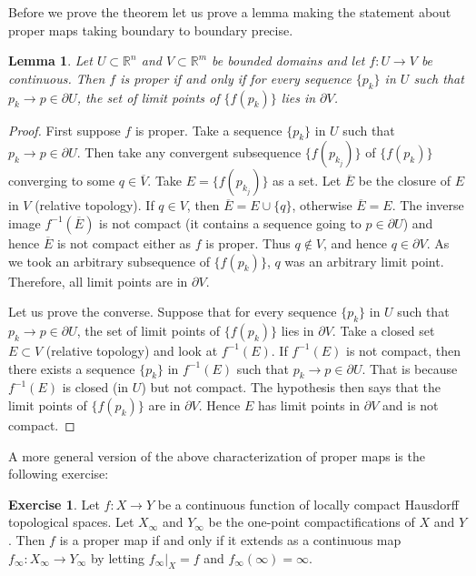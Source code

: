 \documentclass[12pt,openany]{book}
\newcommand{\R}{{\mathbb{R}}}
\theoremstyle{plain}
\newtheorem{lemma}[thm]{Lemma}
\theoremstyle{remark}
\theoremstyle{definition}
\newenvironment{exbox}{%
    \def\FrameCommand{\vrule width 1pt \relax\hspace {10pt}}%
    \MakeFramed {\advance \hsize -\width \FrameRestore }%
}{%
    \endMakeFramed
}
\theoremstyle{exercise}
\newtheorem{exercise}{Exercise}[section]
\theoremstyle{example}
\begin{document}
Before we prove the theorem let us prove a lemma making the statement about
proper maps taking boundary to boundary precise.

\begin{lemma} \label{lemma:bndrytobndry}
Let $U \subset \R^n$ and $V \subset \R^m$ be bounded domains and
let $f \colon U \to V$ be continuous.
Then $f$ is proper if and only if
for every sequence $\{ p_k \}$ in $U$ such that $p_k \to p \in \partial U$,
the set of limit points of $\{ f(p_k) \}$ lies in $\partial V$.
\end{lemma}

\begin{proof}
First suppose $f$ is proper.  Take a 
sequence $\{ p_k \}$ in $U$ such that $p_k \to p \in \partial U$.
Then take any convergent subsequence $\{ f(p_{k_j}) \}$ of $\{ f(p_k) \}$
converging to some $q \in \overline{V}$.  Take
$E = \{ f(p_{k_j}) \}$ as a set.  Let $\overline{E}$ be the closure of $E$
in $V$ (relative topology).  If $q \in V$, then $\overline{E} = E \cup \{ q \}$, otherwise
$\overline{E} = E$.
The inverse image $f^{-1}(\overline{E})$
is not compact (it contains a sequence going to $p \in \partial U$)
and hence $\overline{E}$ is not
compact either as $f$ is proper.  Thus $q \notin V$, and hence $q \in
\partial V$.  As we took an arbitrary subsequence of $\{ f(p_k) \}$, $q$ was
an arbitrary limit point.  Therefore, all limit points are in $\partial V$.

Let us prove the converse.
Suppose that for every sequence
$\{ p_k \}$ in $U$ such that $p_k \to p \in \partial U$,
the set of limit points of $\{ f(p_k) \}$ lies in $\partial V$.
Take a closed set $E \subset V$ (relative topology) and look at $f^{-1}(E)$.  If $f^{-1}(E)$
is not compact, then there exists a sequence $\{ p_k \}$ in $f^{-1}(E)$
such that $p_k \to p \in \partial U$.  That is because $f^{-1}(E)$ is closed
(in $U$) but not compact.  The hypothesis then says that the limit points of
$\{ f(p_k) \}$ are in $\partial V$.  Hence $E$ has limit points in
$\partial V$ and is not compact.
\end{proof}

A more general version of the above characterization of proper maps is the following exercise:

\begin{exbox}
\begin{exercise}
Let $f \colon X \to Y$ be a continuous function of locally compact Hausdorff topological spaces.
Let $X_\infty$ and $Y_\infty$ be the 
one-point compactifications of $X$ and $Y$.
Then $f$ is a proper map if and only if it extends as a continuous map
$f_\infty \colon X_\infty \to Y_\infty$ by letting
$f_\infty |_X = f$ and
 $f_\infty(\infty) = \infty$.
\end{exercise}
\end{exbox}
\end{document}
